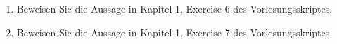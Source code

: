 
\begin{exercise}

\phantom{}

\begin{enumerate}[label = \textbf{\alph*)}]
  \item Beweisen Sie die Aussage in Kapitel 1, Exercise 6 des Vorlesungsskriptes.
  \item Beweisen Sie die Aussage in Kapitel 1, Exercise 7 des Vorlesungsskriptes.
\end{enumerate}

\end{exercise}


